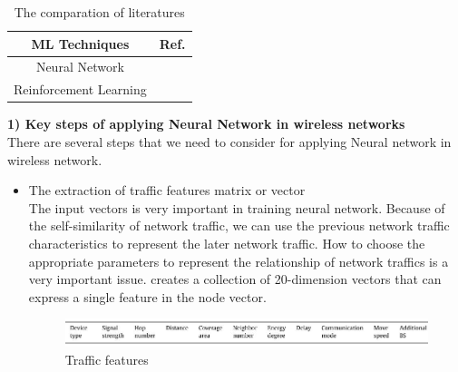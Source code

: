 \documentclass[11pt]{report}
\begin{document}
	
	\begin{table}[!h]
		\centering
		\caption{The comparation of literatures}
		\begin{tabular}{c|c}
			\toprule
			ML Techniques & Ref.\\
			\hline
			Neural Network & \cite{7792369} \cite{7935536} \cite{8088549} \cite{8489985} \cite{8485423}\\
			\hline
			Reinforcement Learning & \cite{4411037} \cite{5408367} \cite{DBLP:journals/corr/abs-1709-07080} \cite{doi:10.1155/2015/618072} \cite{5648764} \cite{8315358}\\
			\hline
		\end{tabular}
	\label{tab2}
	\end{table}
     \noindent \textbf{1) Key steps of applying Neural Network in wireless networks}\\     
     \noindent There are several steps that we need to consider for applying Neural network in wireless network.  
    \begin{itemize}
    	\item The extraction of traffic features matrix or vector\\
    	The input vectors is very important in training neural network. Because of the self-similarity of network traffic, we can use the previous network traffic characteristics to represent the later network traffic. How to choose the appropriate parameters to represent the relationship of network traffics is a very important issue. \cite{YangMinLee} creates a collection of 20-dimension vectors that can express a single feature in the node vector. \\
    	\begin{figure}[h!]
    		\centering
    		\includegraphics[width=0.9\linewidth]{figure4.jpg}
    		\caption{Traffic features}
    		\label{2thfig}
    	\end{figure}\\
    \end{itemize}
\end{document}
